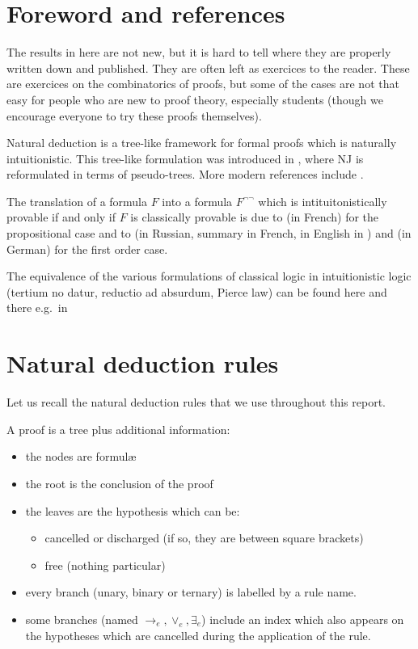 \documentclass[english]{smfart}
\theoremstyle{plain}
\begin{document}
\mainmatter

\section{Foreword and references}

The results in here are not new, 
but it is hard to tell where they are properly written down and published.
They are often left as exercices to the reader. These are exercices 
on the combinatorics of proofs, but some of the cases are not that easy 
for people who are new to proof theory, especially students (though we
encourage everyone to try these proofs themselves). 

Natural deduction is a tree-like framework for formal proofs which is naturally intuitionistic. 
This  tree-like formulation  was introduced in
\cite{Pra65}, where NJ \cite{Gen34,Gen34b} is reformulated  in terms of pseudo-trees. 
More modern references include \cite{GLT88,vanDalen2013}. 

The translation of a formula $F$  into a formula $F^{\lnot\lnot}$
which is intituitonistically provable if and only if $F$ is classically provable is due to 
\cite{Glivenko29} (in French) 
for the propositional case and to 
\cite{Kolmogorov1925} (in Russian, summary in French, in English in \cite{Frege2Goedel1967}) 
and 
\cite{Goedel1933HA,Goedel33nonnon} (in German) 
for the first order case. 

The equivalence of the various formulations of classical logic in intuitionistic logic (tertium no datur, 
reductio ad absurdum, Pierce law) can be found here and there e.g.\ in 
\cite{RasiowaSikorski1963,TD88,Mints2000}

\section{Natural deduction rules}

Let us recall the natural deduction rules that we use throughout this report. 

A proof is a tree plus additional information: 
\begin{itemize} 
\item the nodes are formul\ae\ 
\item the root is the conclusion of the proof
\item the leaves are the hypothesis which can be:
\begin{itemize} 
\item cancelled or discharged (if so, they are between square brackets)
\item free (nothing particular)
\end{itemize}
\item every branch (unary, binary or ternary)  is labelled by a rule name. 
\item some branches (named $\rightarrow_e,\lor_e,\exists_e$)  include an index which also appears on the hypotheses which are cancelled during the application of the rule. 
\end{itemize} 
\end{document}
